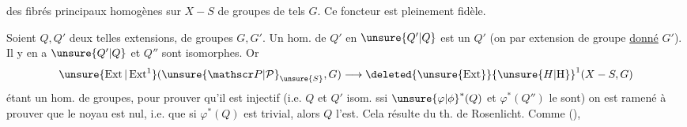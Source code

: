 \noindent\vrule\hspace{.6em}\begin{minipage}{.93\linewidth}
des fibrés principaux homogènes sur $X-S$ de groupes de tels $G$. Ce foncteur est pleinement fidèle.
\end{minipage}\par

Soient $Q,Q'$ deux telles extensions, de groupes $G,G'$. Un hom. de $Q'$ en ${\unsure{Q'|Q}}$ est  un{}     $Q'$  (on {} par extension de groupe \uline{donné} $G'$). Il y en a {} ${\unsure{Q'|Q}}$ et $Q''$ sont isomorphes. Or
\[
{\unsure{\operatorname{Ext}|\operatorname{Ext}^1}}({\unsure{\mathscr P|\mathcal P}}_{{\unsure{S}}},G)\longrightarrow\deleted{{\unsure{\operatorname{Ext}}}}{\unsure{H|\mathrm H}}^1(X-S,G)
\]
étant un hom. de groupes, pour prouver qu’il est injectif (i.e. $Q$ et $Q'$ isom. ssi ${\unsure{\varphi|\phi}}^*(Q)$ et $\varphi^*(Q'')$ le sont) on est ramené à prouver que le noyau est nul, i.e. que si $\varphi^*(Q)$ est trivial, alors $Q$ l’est. Cela résulte   du th. de Rosenlicht.
Comme  ({}),  {}
